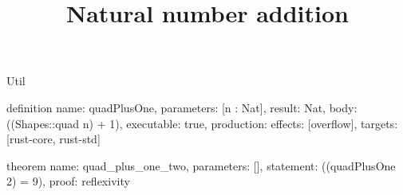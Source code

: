 \begin{lexlean}{Util}
\title{Natural number addition}
\begin{semanticmodule}
definition{
  name: quadPlusOne,
  parameters: [n : Nat],
  result: Nat,
  body: ((Shapes::quad n) + 1),
  executable: true,
  production: {effects: [overflow], targets: [rust-core, rust-std]}
}

theorem{
  name: quad_plus_one_two,
  parameters: [],
  statement: ((quadPlusOne 2) = 9),
  proof: reflexivity{}
}
\end{semanticmodule}
\end{lexlean}

